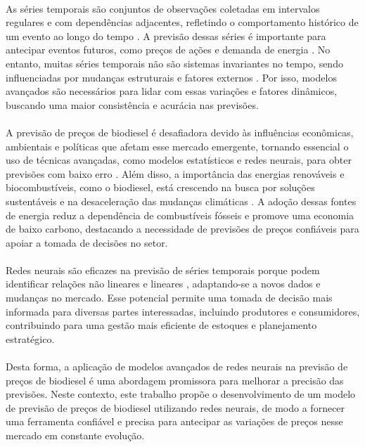 \paragraph{} As séries temporais são conjuntos de observações coletadas em intervalos regulares e com dependências adjacentes, refletindo o comportamento histórico de um evento ao longo do tempo \cite{box2016time}. A previsão dessas séries é importante para antecipar eventos futuros, como preços de ações e demanda de energia \cite{hyndman2018forecasting, Yasin23}. No entanto, muitas séries temporais não são sistemas invariantes no tempo, sendo influenciadas por mudanças estruturais e fatores externos \cite{maniezo2022serie}. Por isso, modelos avançados são necessários para lidar com essas variações e fatores dinâmicos, buscando uma maior consistência e acurácia nas previsões.
\paragraph{} A previsão de preços de biodiesel é desafiadora devido às influências econômicas, ambientais e políticas que afetam esse mercado emergente, tornando essencial o uso de técnicas avançadas, como modelos estatísticos e redes neurais, para obter previsões com baixo erro \cite{alves2022desafios}. Além disso, a importância das energias renováveis e biocombustíveis, como o biodiesel, está crescendo na busca por soluções sustentáveis e na desaceleração das mudanças climáticas \cite{energia_renovavel}. A adoção dessas fontes de energia reduz a dependência de combustíveis fósseis e promove uma economia de baixo carbono, destacando a necessidade de previsões de preços confiáveis para apoiar a tomada de decisões no setor.
\paragraph{} Redes neurais são eficazes na previsão de séries temporais porque podem identificar relações não lineares e lineares \cite{haykin2009neural}, adaptando-se a novos dados e mudanças no mercado. Esse potencial permite uma tomada de decisão mais informada para diversas partes interessadas, incluindo produtores e consumidores, contribuindo para uma gestão mais eficiente de estoques e planejamento estratégico.
\paragraph{} Desta forma, a aplicação de modelos avançados de redes neurais na previsão de preços de biodiesel é uma abordagem promissora para melhorar a precisão das previsões. Neste contexto, este trabalho propõe o desenvolvimento de um modelo de previsão de preços de biodiesel utilizando redes neurais, de modo a fornecer uma ferramenta confiável e precisa para antecipar as variações de preços nesse mercado em constante evolução.

